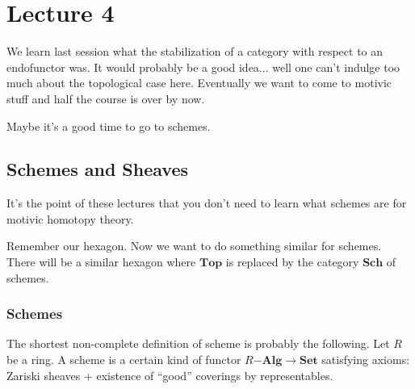 \documentclass[class=report, crop=false,a4paper,twoside]{standalone}
\begin{document}
\chapter{Lecture 4}


We learn last session what the stabilization of a category with respect to an endofunctor was. It would probably be a good idea... well one can't indulge too much about the topological case here. Eventually we want to come to motivic stuff and half the course is over by now.

Maybe it's a good time to go to schemes.

\section{Schemes and Sheaves}
It's the point of these lectures that you don't need to learn what schemes are for motivic homotopy theory. 

Remember our hexagon. Now we want to do something similar for schemes. There will be a similar hexagon where $\mathbf{Top}$ is replaced by the category $\mathbf{Sch}$ of schemes.

\subsection{Schemes}
The shortest non-complete definition of scheme is probably the following. Let $R$ be a ring. A scheme is a certain kind of functor $R\mathbf{-Alg} \to \mathbf{Set}$ satisfying axioms: Zariski sheaves + existence of ``good'' coverings by representables.
\end{document}
